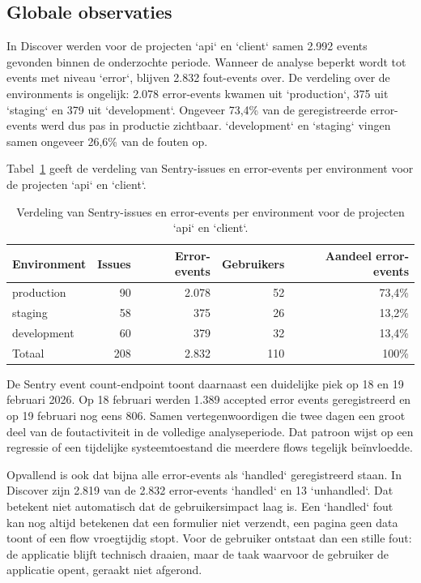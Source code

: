 \subsection{Globale observaties}

In Discover werden voor de projecten `api` en `client` samen 2.992 events gevonden binnen de onderzochte periode. Wanneer de analyse beperkt wordt tot events met niveau `error`, blijven 2.832 fout-events over. De verdeling over de environments is ongelijk: 2.078 error-events kwamen uit `production`, 375 uit `staging` en 379 uit `development`. Ongeveer 73,4\% van de geregistreerde error-events werd dus pas in productie zichtbaar. `development` en `staging` vingen samen ongeveer 26,6\% van de fouten op.

Tabel~\ref{tab:sentry-environment-verdeling} geeft de verdeling van Sentry-issues en error-events per environment voor de projecten `api` en `client`.

\begin{table}[H]
    \centering
    \caption{Verdeling van Sentry-issues en error-events per environment voor de projecten `api` en `client`.}
    \label{tab:sentry-environment-verdeling}
    \begin{tabular}{lrrrr}
        \toprule
        Environment & Issues & Error-events & Gebruikers & Aandeel error-events \\
        \midrule
        production & 90 & 2.078 & 52 & 73,4\% \\
        staging & 58 & 375 & 26 & 13,2\% \\
        development & 60 & 379 & 32 & 13,4\% \\
        \midrule
        Totaal & 208 & 2.832 & 110 & 100\% \\
        \bottomrule
    \end{tabular}
\end{table}

De Sentry event count-endpoint toont daarnaast een duidelijke piek op 18 en 19 februari 2026. Op 18 februari werden 1.389 accepted error events geregistreerd en op 19 februari nog eens 806. Samen vertegenwoordigen die twee dagen een groot deel van de foutactiviteit in de volledige analyseperiode. Dat patroon wijst op een regressie of een tijdelijke systeemtoestand die meerdere flows tegelijk beïnvloedde.

Opvallend is ook dat bijna alle error-events als `handled` geregistreerd staan. In Discover zijn 2.819 van de 2.832 error-events `handled` en 13 `unhandled`. Dat betekent niet automatisch dat de gebruikersimpact laag is. Een `handled` fout kan nog altijd betekenen dat een formulier niet verzendt, een pagina geen data toont of een flow vroegtijdig stopt. Voor de gebruiker ontstaat dan een stille fout: de applicatie blijft technisch draaien, maar de taak waarvoor de gebruiker de applicatie opent, geraakt niet afgerond.


